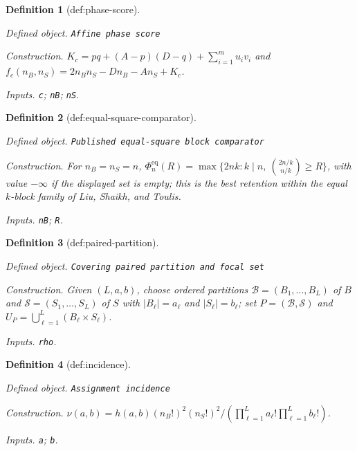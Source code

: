 \documentclass{article}
\newtheorem{definition}{Definition}
\begin{document}
\begin{definition}[def:phase-score]\label{def:phase-score}
\par\smallskip\noindent\emph{Defined object.} \texttt{Affine phase score}
\par\smallskip\noindent\emph{Construction.} \(K_c=pq+(A-p)(D-q)+\sum_{i=1}^{m}u_iv_i\) and \(f_c(n_B,n_S)=2n_Bn_S-Dn_B-An_S+K_c\).
\par\smallskip\noindent\emph{Inputs.} \texttt{c}; \texttt{nB}; \texttt{nS}.
\end{definition}

\begin{definition}[def:equal-square-comparator]\label{def:equal-square-comparator}
\par\smallskip\noindent\emph{Defined object.} \texttt{Published equal-\allowbreak{}square block comparator}
\par\smallskip\noindent\emph{Construction.} For \(n_B=n_S=n\), \(\Phi_n^{\mathrm{eq}}(R)=\max\{2nk:k\mid n,\ \binom{2n/k}{n/k}\ge R\}\), with value \(-\infty\) if the displayed set is empty; this is the best retention within the equal \(k\)-block family of Liu, Shaikh, and Toulis.
\par\smallskip\noindent\emph{Inputs.} \texttt{nB}; \texttt{R}.
\end{definition}

\begin{definition}[def:paired-partition]\label{def:paired-partition}
\par\smallskip\noindent\emph{Defined object.} \texttt{Covering paired partition and focal set}
\par\smallskip\noindent\emph{Construction.} Given \((L,a,b)\), choose ordered partitions \(\mathscr B=(B_1,\ldots,B_L)\) of \(B\) and \(\mathscr S=(S_1,\ldots,S_L)\) of \(S\) with \(|B_\ell|=a_\ell\) and \(|S_\ell|=b_\ell\); set \(P=(\mathscr B,\mathscr S)\) and \(U_P=\bigcup_{\ell=1}^{L}(B_\ell\times S_\ell)\).
\par\smallskip\noindent\emph{Inputs.} \texttt{rho}.
\end{definition}

\begin{definition}[def:incidence]\label{def:incidence}
\par\smallskip\noindent\emph{Defined object.} \texttt{Assignment incidence}
\par\smallskip\noindent\emph{Construction.} \(\nu(a,b)=h(a,b)(n_B!)^2(n_S!)^2\big/(\prod_{\ell=1}^{L}a_\ell!\prod_{\ell=1}^{L}b_\ell!)\).
\par\smallskip\noindent\emph{Inputs.} \texttt{a}; \texttt{b}.
\end{definition}
\end{document}
